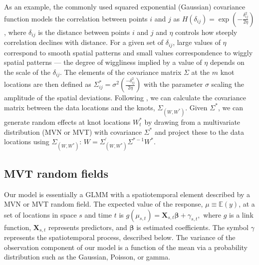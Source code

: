\documentclass[12pt,english]{article}
\begin{document}
\begin{spacing}{1.9}
As an example, the commonly used squared exponential (Gaussian) covariance function
models the correlation between points $i$ and $j$ as $H(\delta_{ij}) = \exp
\left(-\frac{\delta_{ij}^2}{2 \eta} \right)$, where $\delta_{ij}$ is the
distance between points $i$ and $j$ and $\eta$ controls how steeply
correlation declines with distance. For a given set of $\delta_{ij}$,
large values of $\eta$ correspond to smooth spatial patterns and small values
correspondence to wiggly spatial patterns --- the degree of wiggliness implied by
a value of $\eta$ depends on the scale of the $\delta_{ij}$. The elements of the
covariance matrix $\Sigma$ at the $m$ knot locations are then
defined as $\Sigma_{ij}^*=\sigma^2 \left( \frac{-\delta_{ij}^2}{2 \eta} \right)$ with the
parameter $\sigma$ scaling the amplitude of the spatial deviations.
Following \citet{latimer2009}, we can calculate the
covariance matrix between the data locations and the knots,
$\Sigma_{\left(W, W^* \right)}$. Given $\Sigma^*$, we can generate random
effects at knot locations $W_t^*$ by drawing from a multivariate distribution
(MVN or MVT) with covariance $\Sigma^*$ and project these to the data locations
using $\Sigma_{\left( W,W^{*} \right)}$:
$W=\Sigma_{\left(W,W^* \right)}^{'} \Sigma^{*-1}W^*$.


\subsection{MVT random fields}

Our model is essentially a GLMM with a spatiotemporal element described by a MVN
or MVT random field. The expected value of the response, $\mu \equiv
\mathbb{E}(y)$, at a set of locations in space $s$ and time $t$ is $g(\mu_{s,t})
= \bm{X}_{s,t} \bm{\beta} + \gamma_{s,t},$ where $g$ is a link function,
$\bm{X}_{s,t}$ represents predictors, and $\bm{\beta}$ is estimated
coefficients. The symbol $\gamma$ represents the spatiotemporal process,
described below. The variance of the observation component of our model is a
function of the mean via a probability distribution such as the Gaussian,
Poisson, or gamma.


\end{spacing}
\end{document}
